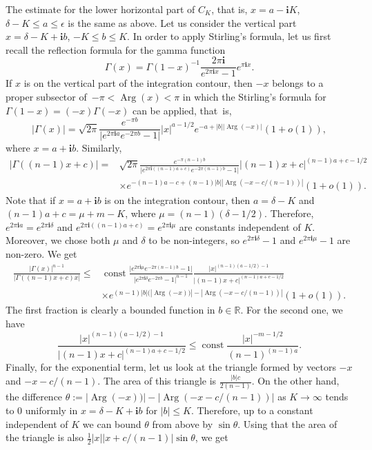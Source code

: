 \documentclass[pdftex]{sigma}
\numberwithin{equation}{section}
\newcommand{\RR}{\mathbb{R}}
\newcommand{\ii}{\mathbf{i}}
\begin{document}
The estimate for the lower horizontal part of $C_K$, that is, $x=a-\ii K$, $\delta-K\leq a\leq \epsilon$ is the same as above. Let us consider the vertical part $x=\delta-K+\ii b$, $-K\leq b\leq K$. In order to apply Stirling's formula, let us first recall the reflection formula for the gamma function
\[
\Gamma(x)=
\Gamma(1-x)^{-1}
\frac{2\pi \ii}{e^{2\pi\ii x} -1}
e^{\pi\ii x}.
\]
If $x$ is on the vertical part of the integration contour, then $-x$ belongs to a proper subsector of~${-\pi< \operatorname{Arg}(x)<\pi}$ in which the Stirling's formula for $\Gamma(1-x)= (-x) \Gamma(-x)$ can be applied, that~is,
\[
|\Gamma(x)|= \sqrt{2\pi}
\frac{e^{-\pi b}}{\big|e^{2\pi\ii a} e^{-2\pi b}-1\big|}
|x|^{a-1/2}
e^{-a+|b| |{\operatorname{Arg}}(-x)|}
(1+o(1)),
\]
where $x=a+\ii b$. Similarly,
\begin{align*}
|\Gamma((n-1)x+c)| ={} &
\sqrt{2\pi}
\frac{e^{-\pi (n-1) b}}{\big|e^{2\pi\ii ((n-1)a+c)} e^{-2\pi (n-1)b}-1\big|}
|(n-1)x+c|^{(n-1)a+c-1/2}\\
&
\times
e^{-(n-1)a-c+(n-1)|b| |{\operatorname{Arg}}(-x-c/(n-1))|}
(1+o(1)).
\end{align*}
Note that if $x=a+\ii b$ is on the integration contour, then $a=\delta-K$ and $(n-1)a+c= \mu +m-K$, where $\mu=(n-1)(\delta-1/2)$. Therefore, $e^{2\pi\ii a}=e^{2\pi\ii\delta}$ and
$e^{2\pi\ii ((n-1)a+c)} = e^{2\pi\ii \mu}$ are constants independent of $K$. Moreover, we chose both $\mu$ and $\delta$ to be non-integers, so $e^{2\pi\ii\delta}-1$ and $e^{2\pi\ii\mu}-1$ are non-zero.
We get
\begin{align*}
\frac{|\Gamma(x)|^{n-1}}{
|\Gamma((n-1)x+c) x| }\leq {}& \operatorname{const}
\frac{\big| e^{2\pi\ii \mu} e^{-2\pi (n-1) b}-1\big|}{
\big| e^{2\pi\ii \delta} e^{-2\pi b}-1\big|^{n-1}}
\frac{|x|^{(n-1)(a-1/2)-1}}{
|(n-1)x+c|^{(n-1)a+c-1/2}} \\
&
\times
e^{(n-1)|b|(
|{\operatorname{Arg}}(-x))|-|{\operatorname{Arg}}(-x-c/(n-1) )|}
(1+o(1)).
\end{align*}
The first fraction is clearly a bounded function in $b\in \RR$. For the second one, we have
\[
\frac{|x|^{(n-1)(a-1/2)-1}}{
|(n-1)x+c|^{(n-1)a+c-1/2}}\leq \operatorname{const}
\frac{|x|^{-m-1/2}}{
(n-1)^{(n-1)a}}.
\]
Finally, for the exponential term, let us look at the triangle formed by vectors $-x$ and $-x-c/(n-1)$. The area of this triangle is
$\frac{|b|c}{2(n-1)}$. On the other hand, the difference $\theta:=|{\operatorname{Arg}}(-x))|-|{\operatorname{Arg}}(-x-c/(n-1) )|$ as $K\rightarrow \infty$ tends to $0$ uniformly in $x=\delta-K+\ii b$ for $|b|\leq K$. Therefore, up to a constant independent of $K$ we can bound $\theta$ from above by $\sin \theta$. Using that the area of the triangle is also $\tfrac{1}{2} |x| |x+c/(n-1)| \sin\theta$, we get
\end{document}
